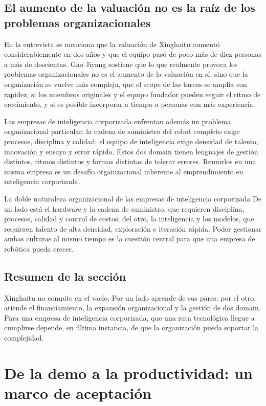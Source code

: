 \documentclass[a4paper]{article}
\begin{document}
\subsection{El aumento de la valuación no es la raíz de los problemas organizacionales}

En la entrevista se menciona que la valuación de Xinghaitu aumentó considerablemente en dos años y que el equipo pasó de poco más de diez personas a más de doscientas. Gao Jiyang sostiene que lo que realmente provoca los problemas organizacionales no es el aumento de la valuación en sí, sino que la organización se vuelve más compleja, que el scope de las tareas se amplía con rapidez, si los miembros originales y el equipo fundador pueden seguir el ritmo de crecimiento, y si es posible incorporar a tiempo a personas con más experiencia.

Las empresas de inteligencia corporizada enfrentan además un problema organizacional particular: la cadena de suministro del robot completo exige procesos, disciplina y calidad; el equipo de inteligencia exige densidad de talento, innovación y ensayo y error rápido. Estos dos domain tienen lenguajes de gestión distintos, ritmos distintos y formas distintas de tolerar errores. Reunirlos en una misma empresa es un desafío organizacional inherente al emprendimiento en inteligencia corporizada.

\begin{importantbox}{La doble naturaleza organizacional de las empresas de inteligencia corporizada}
De un lado está el hardware y la cadena de suministro, que requieren disciplina, procesos, calidad y control de costos; del otro, la inteligencia y los modelos, que requieren talento de alta densidad, exploración e iteración rápida. Poder gestionar ambas culturas al mismo tiempo es la cuestión central para que una empresa de robótica pueda crecer.
\end{importantbox}

\subsection{Resumen de la sección}

Xinghaitu no compite en el vacío. Por un lado aprende de sus pares; por el otro, atiende el financiamiento, la expansión organizacional y la gestión de dos domain. Para una empresa de inteligencia corporizada, que una ruta tecnológica llegue a cumplirse depende, en última instancia, de que la organización pueda soportar la complejidad.
\section{De la demo a la productividad: un marco de aceptación}
\end{document}
